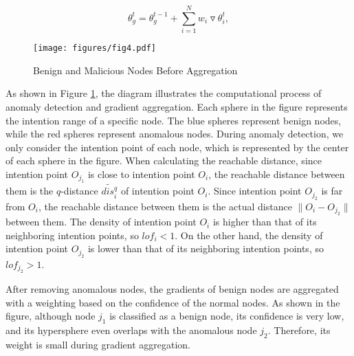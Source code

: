 \documentclass[lettersize,journal]{IEEEtran}
\begin{document}
\begin{equation}
    \theta_g^t = \theta_g^{t-1}+\sum_{i=1}^{N}w_i\triangledown \theta_i^t,
\end{equation}


\begin{figure}[!t]
    \centering
    \texttt{[image: figures/fig4.pdf]}
    \caption{Benign and Malicious Nodes Before Aggregation}
    \label{fig:before-agg}
\end{figure}
As shown in Figure \ref{fig:before-agg}, the diagram illustrates the computational process of anomaly detection and gradient aggregation. Each sphere in the figure represents the intention range of a specific node. The blue spheres represent benign nodes, while the red spheres represent anomalous nodes. During anomaly detection, we only consider the intention point of each node, which is represented by the center of each sphere in the figure. When calculating the reachable distance, since intention point $O_{j_1}$ is close to intention point $O_i$, the reachable distance between them is the $q$-distance $\widetilde{dis_i^q}$ of intention point $O_i$. Since intention point $O_{j_2}$ is far from $O_i$, the reachable distance between them is the actual distance $\|O_i-O_{j_2}\|$ between them. The density of intention point $O_i$ is higher than that of its neighboring intention points, so $lof_i < 1$. On the other hand, the density of intention point $O_{j_2}$ is lower than that of its neighboring intention points, so $lof_{j_2} > 1$.

After removing anomalous nodes, the gradients of benign nodes are aggregated with a weighting based on the confidence of the normal nodes. As shown in the figure, although node $j_1$ is classified as a benign node, its confidence is very low, and its hypersphere even overlaps with the anomalous node $j_2$. Therefore, its weight is small during gradient aggregation.
\end{document}
